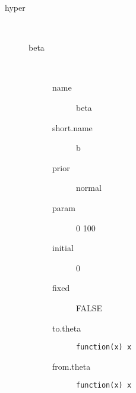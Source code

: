 \begin{description}
	\item[hyper]\ 
	 \begin{description}
	 	\item[beta]\ 
	 	 \begin{description}
	 	 	\item[name] beta
	 	 	\item[short.name] b
	 	 	\item[prior] normal
	 	 	\item[param] 0 100
	 	 	\item[initial] 0
	 	 	\item[fixed] FALSE
	 	 	\item[to.theta] \verb|function(x) x|
	 	 	\item[from.theta] \verb|function(x) x|
	 	 \end{description}
	 \end{description}
\end{description}
